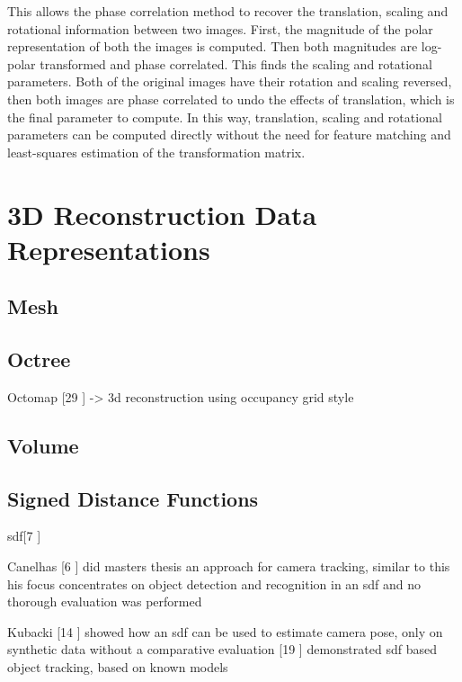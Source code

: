 This allows the phase correlation method to recover the translation, scaling and rotational information between two images. First, the magnitude of the polar representation of both the images is computed. Then both magnitudes are log-polar transformed and phase correlated. This finds the scaling and rotational parameters. Both of the original images have their rotation and scaling reversed, then both images are phase correlated to undo the effects of translation, which is the final parameter to compute. In this way, translation, scaling and rotational parameters can be computed directly without the need for feature matching and least-squares estimation of the transformation matrix. \\


\section{3D Reconstruction Data Representations}

\subsection{Mesh}
\subsection{Octree}

\cite{Wurm10Octomap}
Octomap [29 \cite{Wurm10Octomap}] -> 3d reconstruction using occupancy grid style 

\subsection{Volume}

\subsection{Signed Distance Functions}

sdf[7 \cite{Curless96Volumetric}]

Canelhas [6 \cite{Canelhas12Scene}] did masters thesis an approach for camera tracking, similar to this
his focus concentrates on object detection and recognition in an sdf and no thorough evaluation was performed

Kubacki [14 \cite{Kubacki12Registration}] showed how an sdf can be used to estimate camera pose, only on synthetic data without a comparative evaluation
[19 \cite{Ren12Unified}] demonstrated sdf based object tracking, based on known models

